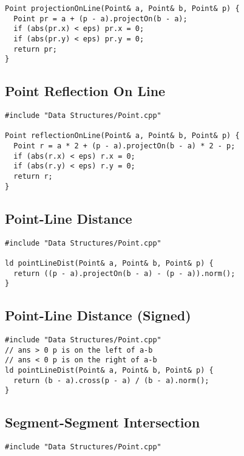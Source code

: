 \documentclass[twoside]{article}
\newcommand{\fileTitleStyle}{\large\underline}
\begin{document}
\begin{multicols*}{2}
\begin{verbatim}
Point projectionOnLine(Point& a, Point& b, Point& p) {
  Point pr = a + (p - a).projectOn(b - a);
  if (abs(pr.x) < eps) pr.x = 0;
  if (abs(pr.y) < eps) pr.y = 0;
  return pr;
}
\end{verbatim}

\subsectionfont{\centering\bfseries\LARGE}
\subsectionfont{\fileTitleStyle}
\subsection*{Point Reflection On Line}
\begin{verbatim}
#include "Data Structures/Point.cpp"

Point reflectionOnLine(Point& a, Point& b, Point& p) {
  Point r = a * 2 + (p - a).projectOn(b - a) * 2 - p;
  if (abs(r.x) < eps) r.x = 0;
  if (abs(r.y) < eps) r.y = 0;
  return r;
}
\end{verbatim}

\subsectionfont{\centering\bfseries\LARGE}
\subsectionfont{\fileTitleStyle}
\subsection*{Point-Line Distance}
\begin{verbatim}
#include "Data Structures/Point.cpp"

ld pointLineDist(Point& a, Point& b, Point& p) {
  return ((p - a).projectOn(b - a) - (p - a)).norm();
}
\end{verbatim}

\subsectionfont{\centering\bfseries\LARGE}
\subsectionfont{\fileTitleStyle}
\subsection*{Point-Line Distance (Signed)}
\begin{verbatim}
#include "Data Structures/Point.cpp"
// ans > 0 p is on the left of a-b
// ans < 0 p is on the right of a-b
ld pointLineDist(Point& a, Point& b, Point& p) {
  return (b - a).cross(p - a) / (b - a).norm();
}
\end{verbatim}

\subsectionfont{\centering\bfseries\LARGE}
\subsectionfont{\fileTitleStyle}
\subsection*{Segment-Segment Intersection}
\begin{verbatim}
#include "Data Structures/Point.cpp"


\end{verbatim}
\end{multicols*}
\end{document}
